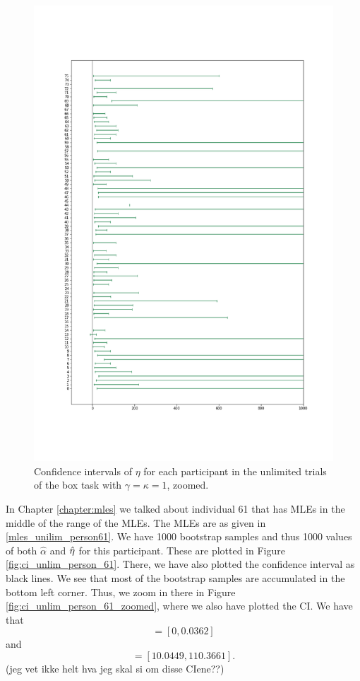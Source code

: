 \begin{figure}
    \centering
    \includegraphics[scale=0.38]{pictures/all_cis_unlim_eta_zoomed.png}
    \caption[CIs for $\eta$ zoomed, unlimited. $\gamma=\kappa=1$]{Confidence intervals of $\eta$ for each participant in the unlimited trials of the box task with $\gamma=\kappa=1$, zoomed.}
    \label{fig:all_cis_eta_unlim_zoomed}
\end{figure}


In Chapter \ref{chapter:mles} we talked about individual 61 that has MLEs in the middle of the range of the MLEs. The MLEs are as given in \eqref{mles_unilim_person61}.
We have 1000 bootstrap samples and thus 1000 values of both $\hat{\alpha}$ and $\hat{\eta}$ for this participant. These are plotted in Figure \ref{fig:ci_unlim_person_61}. There, we have also plotted the confidence interval as black lines. We see that most of the bootstrap samples are accumulated in the bottom left corner. Thus, we zoom in there in Figure \ref{fig:ci_unlim_person_61_zoomed}, where we also have plotted the CI. We have that
\begin{equation*}
    [\hat{\alpha}^{*(5)}_{1000},\hat{\alpha}^{*(95)}_{1000}] = [0,0.0362]
\end{equation*}
and
\begin{equation*}
    [\hat{\eta}^{*(5)}_{1000},\hat{\eta}^{*(95)}_{1000}] = [10.0449,110.3661].
\end{equation*}
(jeg vet ikke helt hva jeg skal si om disse CIene??)

